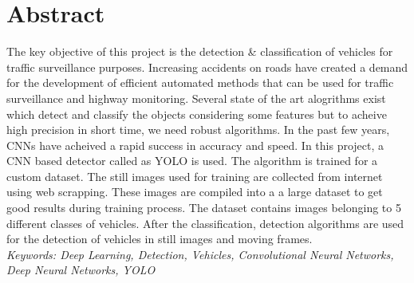 
\chapter*{Abstract}
\vspace{-3mm}
The key objective of this project is the detection \& classification of vehicles for traffic surveillance purposes.
Increasing accidents on roads have created a demand for the development of efficient automated methods that can be used for traffic surveillance and highway monitoring.
Several state of the art alogrithms exist which detect and classify the objects considering
some features but to acheive high precision in short time, we need robust algorithms. In the past few years, CNNs have
acheived a rapid success in accuracy and speed. In this project, a CNN based detector called as YOLO is used. The algorithm is
trained for a custom dataset. The still images used for training are collected from internet using web scrapping. These images are compiled  into a
a large dataset
to get good results during training process. The dataset contains images belonging to 5 different classes of vehicles. After the classification, detection algorithms are used for the detection of vehicles in still images
and moving frames. 
\vspace{15mm}\ \\
\textit{Keywords: Deep Learning, Detection, Vehicles, Convolutional Neural Networks, Deep Neural Networks, YOLO}
